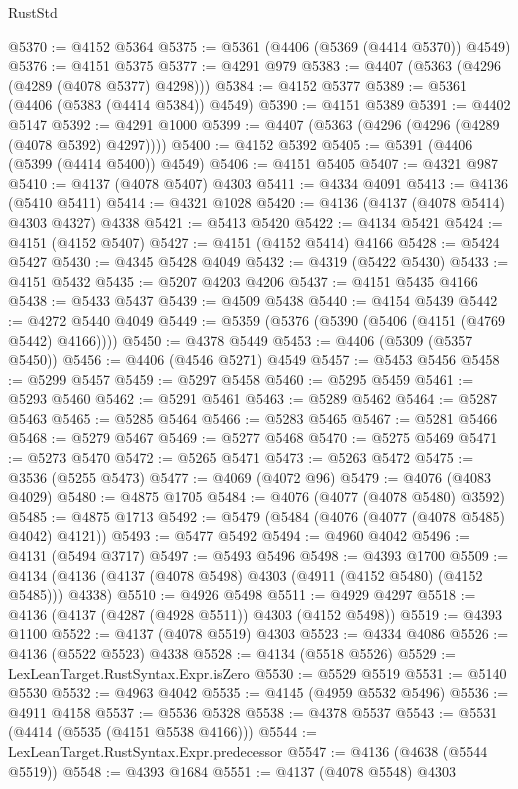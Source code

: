 \begin{lexlean}{RustStd}
\begin{coremodule}
@5370 := @4152 @5364
@5375 := @5361 (@4406 (@5369 (@4414 @5370)) @4549)
@5376 := @4151 @5375
@5377 := @4291 @979
@5383 := @4407 (@5363 (@4296 (@4289 (@4078 @5377) @4298)))
@5384 := @4152 @5377
@5389 := @5361 (@4406 (@5383 (@4414 @5384)) @4549)
@5390 := @4151 @5389
@5391 := @4402 @5147
@5392 := @4291 @1000
@5399 := @4407 (@5363 (@4296 (@4296 (@4289 (@4078 @5392) @4297))))
@5400 := @4152 @5392
@5405 := @5391 (@4406 (@5399 (@4414 @5400)) @4549)
@5406 := @4151 @5405
@5407 := @4321 @987
@5410 := @4137 (@4078 @5407) @4303
@5411 := @4334 @4091
@5413 := @4136 (@5410 @5411)
@5414 := @4321 @1028
@5420 := @4136 (@4137 (@4078 @5414) @4303 @4327) @4338
@5421 := @5413 @5420
@5422 := @4134 @5421
@5424 := @4151 (@4152 @5407)
@5427 := @4151 (@4152 @5414) @4166
@5428 := @5424 @5427
@5430 := @4345 @5428 @4049
@5432 := @4319 (@5422 @5430)
@5433 := @4151 @5432
@5435 := @5207 @4203 @4206
@5437 := @4151 @5435 @4166
@5438 := @5433 @5437
@5439 := @4509 @5438
@5440 := @4154 @5439
@5442 := @4272 @5440 @4049
@5449 := @5359 (@5376 (@5390 (@5406 (@4151 (@4769 @5442) @4166))))
@5450 := @4378 @5449
@5453 := @4406 (@5309 (@5357 @5450))
@5456 := @4406 (@4546 @5271) @4549
@5457 := @5453 @5456
@5458 := @5299 @5457
@5459 := @5297 @5458
@5460 := @5295 @5459
@5461 := @5293 @5460
@5462 := @5291 @5461
@5463 := @5289 @5462
@5464 := @5287 @5463
@5465 := @5285 @5464
@5466 := @5283 @5465
@5467 := @5281 @5466
@5468 := @5279 @5467
@5469 := @5277 @5468
@5470 := @5275 @5469
@5471 := @5273 @5470
@5472 := @5265 @5471
@5473 := @5263 @5472
@5475 := @3536 (@5255 @5473)
@5477 := @4069 (@4072 @96)
@5479 := @4076 (@4083 @4029)
@5480 := @4875 @1705
@5484 := @4076 (@4077 (@4078 @5480) @3592)
@5485 := @4875 @1713
@5492 := @5479 (@5484 (@4076 (@4077 (@4078 @5485) @4042) @4121))
@5493 := @5477 @5492
@5494 := @4960 @4042
@5496 := @4131 (@5494 @3717)
@5497 := @5493 @5496
@5498 := @4393 @1700
@5509 := @4134 (@4136 (@4137 (@4078 @5498) @4303 (@4911 (@4152 @5480) (@4152 @5485))) @4338)
@5510 := @4926 @5498
@5511 := @4929 @4297
@5518 := @4136 (@4137 (@4287 (@4928 @5511)) @4303 (@4152 @5498))
@5519 := @4393 @1100
@5522 := @4137 (@4078 @5519) @4303
@5523 := @4334 @4086
@5526 := @4136 (@5522 @5523) @4338
@5528 := @4134 (@5518 @5526)
@5529 := LexLeanTarget.RustSyntax.Expr.isZero
@5530 := @5529 @5519
@5531 := @5140 @5530
@5532 := @4963 @4042
@5535 := @4145 (@4959 @5532 @5496)
@5536 := @4911 @4158
@5537 := @5536 @5328
@5538 := @4378 @5537
@5543 := @5531 (@4414 (@5535 (@4151 @5538 @4166)))
@5544 := LexLeanTarget.RustSyntax.Expr.predecessor
@5547 := @4136 (@4638 (@5544 @5519))
@5548 := @4393 @1684
@5551 := @4137 (@4078 @5548) @4303

\end{coremodule}
\end{lexlean}
